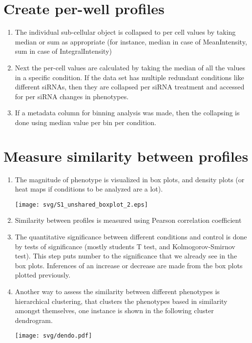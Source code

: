 \documentclass[12pt]{article}
\begin{document}
\section{Create per-well profiles}
	\begin{enumerate}
		\item The individual sub-cellular object is collapsed to per cell values by taking median or sum as appropriate (for instance, median in case of MeanIntensity, sum in case of IntegralIntensity)
		\item Next the per-cell values are calculated by taking the median of all the values in a specific condition. If the data set has multiple redundant conditions like different siRNAs, then they are collapsed per siRNA treatment and accessed for per siRNA changes in phenotypes.
		\item If a metadata column for binning analysis was made, then the collapsing is done using median value per bin per condition.
	\end{enumerate}
	

\section{Measure similarity between profiles}
	\begin{enumerate}
		\item The magnitude of phenotype is visualized in box plots, and density plots (or heat maps if conditions to be analyzed are a lot).
		\begin{center} \texttt{[image: svg/S1\_unshared\_boxplot\_2.eps]} \end{center}	
		\item Similarity between profiles is measured using Pearson correlation coefficient
		\item The quantitative significance between different conditions and control is done by tests of significance (mostly students T test, and Kolmogorov-Smirnov test). This step puts number to the significance that we already see in the box plots. Inferences of an increase or decrease are made from the box plots plotted previously.
		\item Another way to assess the similarity between different phenotypes is hierarchical clustering, that clusters the phenotypes based in similarity amongst themselves, one instance is shown in the following cluster dendrogram.
		\begin{center} \texttt{[image: svg/dendo.pdf]} \end{center}	
	\end{enumerate}
	
\end{document}
